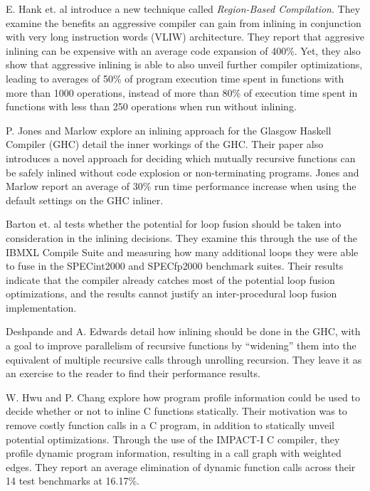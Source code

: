 E. Hank et. al \cite{RegionBasedCompilationIntroduction} introduce a new
technique called \textit{Region-Based Compilation}. They examine the benefits an
aggressive compiler can gain from inlining in conjunction with very long
instruction words (VLIW) architecture. They report that aggresive inlining can
be expensive with an average code expansion of 400\%. Yet, they also show that
aggressive inlining is able to also unveil further compiler optimizations,
leading to averages of 50\% of program execution time spent in functions with
more than 1000 operations, instead of more than 80\% of execution time spent in
functions with less than 250 operations when run without inlining.

P. Jones and Marlow \cite{GHCPaper} explore an inlining approach for the Glasgow
Haskell Compiler (GHC) detail the inner workings of the GHC. Their paper also
introduces a novel approach for deciding which mutually recursive functions can
be safely inlined without code explosion or non-terminating programs. Jones and
Marlow report an average of 30\% run time performance increase when using the
default settings on the GHC inliner.

Barton et. al \cite{ShouldLoopOptsInfluenceInlining} tests whether the potential
for loop fusion should be taken into consideration in the inlining decisions.
They examine this through the use of the IBM\textregistered XL Compile
Suite and measuring how many additional loops they were able to fuse in the
SPECint2000 and SPECfp2000 benchmark suites. Their results indicate that the
compiler already catches most of the potential loop fusion optimizations, and
the results cannot justify an inter-procedural loop fusion implementation.

Deshpande and A. Edwards \cite{deshpande2012statically} detail how inlining
should be done in the GHC, with a goal to improve parallelism of recursive
functions by ``widening'' them into the equivalent of multiple recursive calls
through unrolling recursion. They leave it as an exercise to the reader to find
their performance results.

W. Hwu and P. Chang \cite{InlineFuncExpCProgs} explore how program profile
information could be used to decide whether or not to inline C functions
statically. Their motivation was to remove costly function calls in a C program,
in addition to statically unveil potential optimizations. Through the use of the
IMPACT-I C compiler, they profile dynamic program information, resulting in a
call graph with weighted edges. They report an average elimination of dynamic
function calls across their 14 test benchmarks at 16.17\%.
